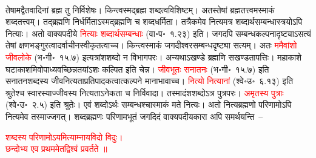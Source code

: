 \\
\begin{sloppypar}\justifying\noindent तेषामद्वैत\-वादिनां ब्रह्म तु निर्विशेषः। किन्त्वस्मद्ब्रह्म शब्दत्व\-विशिष्टम्। अतस्तेषां ब्रह्म\-तत्त्वमस्माकं शब्द\-तत्त्वम्। तद्ब्रह्मणि निर्धर्मिताऽस्मद्ब्रह्मणि च शब्द\-धर्मिता। तत्रैकमेव नित्यमत्र शब्दार्थ\-सम्बन्धास्त्रयोऽपि नित्याः। अतो वाक्यपदीये \textcolor{red}{नित्याः शब्दार्थसम्बन्धाः} (वा॰प॰~१.२३) इति। जगदपि सम्बन्ध\-कल्पना\-दृष्ट्याऽसत्यं तेषां क्षण\-भङ्गुरत्वादर्वाचीन\-स्वीकृतत्वाच्च। किन्त्वस्माकं जगदीश्वर\-सम्बन्ध\-दृष्ट्या सत्यम्। अतः \textcolor{red}{ममैवांशो जीव\-लोके} (भ॰गी॰~१५.७) इत्यत्रांश\-शब्दो न विभाग\-परः। अन्यथाऽखण्डे ब्रह्मणि सखण्डतापत्तिः। महाकाशे घटाकाशमिवोपाध्यवच्छिन्नतयांऽशः कल्पित इति चेन्न। \textcolor{red}{जीव\-भूतः सनातनः} (भ॰गी॰~१५.७) इति सनातन\-शब्दस्य जीव\-नित्यता\-प्रतिपादकत्वात्कल्पने मानाभावाच्च। \textcolor{red}{नित्यो नित्यानां} (श्वे॰उ॰~६.१३) इति श्रुतेश्च स्वारस्याज्जीवस्य नित्यताऽनेकता च निर्विवादा। तस्मादंश\-शब्दोऽत्र पुत्र\-परः। \textcolor{red}{अमृतस्य पुत्राः} (श्वे॰उ॰~२.५) इति श्रुतेः। एवं शब्दोऽर्थः सम्बन्धश्चास्माकं मते नित्यः।
अतो नित्य\-ब्रह्मणो परिणामोऽपि नित्यमेव तस्माज्जगत्। शब्द\-ब्रह्मणः परिणाम\-भूतं जगदिदं वाक्यपदीय\-कारा अपि समर्थयन्ति~–\end{sloppypar}
\centering\textcolor{red}{शब्दस्य परिणामोऽयमित्याम्नायविदो विदुः। \nopagebreak\\
छन्दोभ्य एव प्रथममेतद्विश्वं प्रवर्तते ॥}\nopagebreak\\
\\
